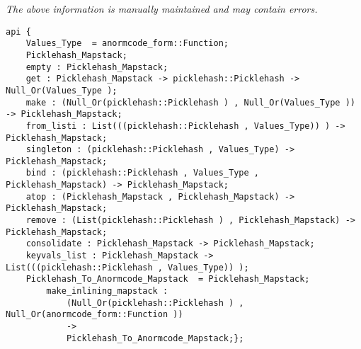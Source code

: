 \label{api:Inlining\_Mapstack}

{\tiny \it The above information is manually maintained and may contain errors.}
\begin{verbatim}
api {
    Values_Type  = anormcode_form::Function;
    Picklehash_Mapstack;
    empty : Picklehash_Mapstack;
    get : Picklehash_Mapstack -> picklehash::Picklehash -> Null_Or(Values_Type );
    make : (Null_Or(picklehash::Picklehash ) , Null_Or(Values_Type )) -> Picklehash_Mapstack;
    from_listi : List(((picklehash::Picklehash , Values_Type)) ) -> Picklehash_Mapstack;
    singleton : (picklehash::Picklehash , Values_Type) -> Picklehash_Mapstack;
    bind : (picklehash::Picklehash , Values_Type , Picklehash_Mapstack) -> Picklehash_Mapstack;
    atop : (Picklehash_Mapstack , Picklehash_Mapstack) -> Picklehash_Mapstack;
    remove : (List(picklehash::Picklehash ) , Picklehash_Mapstack) -> Picklehash_Mapstack;
    consolidate : Picklehash_Mapstack -> Picklehash_Mapstack;
    keyvals_list : Picklehash_Mapstack -> List(((picklehash::Picklehash , Values_Type)) );
    Picklehash_To_Anormcode_Mapstack  = Picklehash_Mapstack;
        make_inlining_mapstack :
            (Null_Or(picklehash::Picklehash ) , Null_Or(anormcode_form::Function ))
            ->
            Picklehash_To_Anormcode_Mapstack;};
\end{verbatim}
